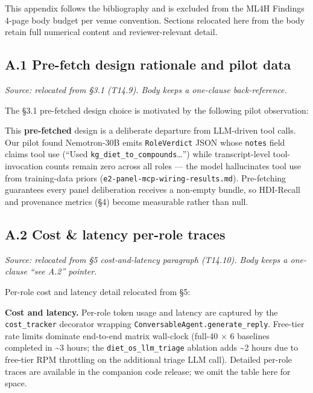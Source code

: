 \documentclass[
]{article}
\begin{document}
This appendix follows the bibliography and is excluded from the ML4H
Findings 4-page body budget per venue convention. Sections relocated
here from the body retain full numerical content and reviewer-relevant
detail.

\hypertarget{a.1-pre-fetch-design-rationale-and-pilot-data}{%
\subsection{A.1 Pre-fetch design rationale and pilot
data}\label{a.1-pre-fetch-design-rationale-and-pilot-data}}

\emph{Source: relocated from §3.1 (T14.9). Body keeps a one-clause
back-reference.}

The §3.1 pre-fetched design choice is motivated by the following pilot
observation:

This \textbf{pre-fetched} design is a deliberate departure from
LLM-driven tool calls. Our pilot found Nemotron-30B emits
\texttt{RoleVerdict} JSON whose \texttt{notes} field claims tool use
(``Used \texttt{kg\_diet\_to\_compounds}\ldots{}'') while
transcript-level tool-invocation counts remain zero across all roles ---
the model hallucinates tool use from training-data priors
(\texttt{e2-panel-mcp-wiring-results.md}). Pre-fetching guarantees every
panel deliberation receives a non-empty bundle, so HDI-Recall and
provenance metrics (§4) become measurable rather than null.

\hypertarget{a.2-cost-latency-per-role-traces}{%
\subsection{A.2 Cost \& latency per-role
traces}\label{a.2-cost-latency-per-role-traces}}

\emph{Source: relocated from §5 cost-and-latency paragraph (T14.10).
Body keeps a one-clause ``see A.2'' pointer.}

Per-role cost and latency detail relocated from §5:

\textbf{Cost and latency.} Per-role token usage and latency are captured
by the \texttt{cost\_tracker} decorator wrapping
\texttt{ConversableAgent.generate\_reply}. Free-tier rate limits
dominate end-to-end matrix wall-clock (full-40 × 6 baselines completed
in \textasciitilde3 hours; the \texttt{diet\_os\_llm\_triage} ablation
adds \textasciitilde2 hours due to free-tier RPM throttling on the
additional triage LLM call). Detailed per-role traces are available in
the companion code release; we omit the table here for space.
\end{document}
